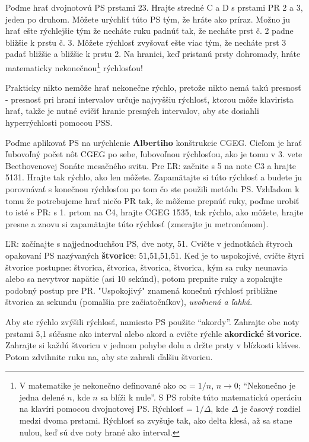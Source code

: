 \documentclass[11pt,a4paper]{book}
\begin{document}
Poďme hrať dvojnotovú PS prstami 23. Hrajte stredné C a D s prstami PR 2 a 3, jeden po druhom. Môžete urýchliť túto PS tým, že hráte ako príraz. Možno ju hrať ešte rýchlejšie tým že necháte ruku padnúť tak, že necháte prst č. 2 padne bližšie k prstu č. 3. Môžete rýchlosť zvyšovať ešte viac tým, že necháte prst 3 padať bližšie a bližšie k prstu 2. Na hranici, keď pristanú prsty dohromady, hráte matematicky nekonečnou\footnote{V matematike je nekonečno definované ako $\infty = 1 / n$, $n → 0$; “Nekonečno je jedna delené $n$, kde $n$ sa blíži k nule”. S PS robíte túto matematickú operáciu na klavíri pomocou dvojnotovej PS. Rýchlosť = $1 / \Delta$, kde $\Delta$ je časový rozdiel medzi dvoma prstami. Rýchlosť sa zvyšuje tak, ako delta klesá, až sa stane nulou, keď sú dve noty hrané ako interval.} rýchlosťou!

Prakticky nikto nemôže hrať nekonečne rýchlo, pretože nikto nemá takú presnosť - presnosť pri hraní intervalov určuje najvyššiu rýchlosť, ktorou môže klavirista hrať, takže je nutné cvičiť hranie presných intervalov, aby ste dosiahli hyperrýchlosti pomocou PSS.

Poďme aplikovať PS na urýchlenie \textbf{Albertiho} konštrukcie CGEG. Cieľom je hrať ľubovoľný počet nôt CGEG po sebe, ľubovoľnou rýchlosťou, ako je tomu v 3. vete Beethovenovej Sonáte mesačného svitu. Pre ĽR: začnite s 5 na note C3 a hrajte 5131. Hrajte tak rýchlo, ako len môžete. Zapamätajte si túto rýchlosť a budete ju porovnávať s konečnou rýchlosťou po tom čo ste použili metódu PS. Vzhľadom k tomu že potrebujeme hrať niečo PR tak, že môžeme prepnúť ruky, poďme urobiť to isté s PR: s 1. prtom na C4, hrajte CGEG 1535, tak rýchlo, ako môžete, hrajte presne a znovu si zapamätajte túto rýchlosť (zmerajte ju metronómom).

ĽR: začínajte s najjednoduchšou PS, dve noty, 51. Cvičte v jednotkách štyroch opakovaní PS nazývaných \textbf{štvorice}: 51,51,51,51. Keď je to uspokojivé, cvičte štyri štvorice postupne: štvorica, štvorica, štvorica, štvorica, kým sa ruky neunavia alebo sa nevytvor napätie (asi 10 sekúnd), potom prepnite ruky a zopakujte podobný postup pre PR. "Uspokojivý" znamená konečnú rýchlosť približne štvorica za sekundu (pomalšia pre začiatočníkov), \emph{uvoľnená a ľahká}.

Aby ste rýchlo zvýšili rýchlosť, namiesto PS použite “akordy”. Zahrajte obe noty prstami 5,1 súčasne ako interval alebo akord a cvičte rýchle \textbf{akordické štvorice}. Zahrajte si každú štvoricu v jednom pohybe dolu a držte prsty v blízkosti kláves. Potom zdvihnite ruku na, aby ste zahrali ďalšiu štvoricu.
\end{document}
